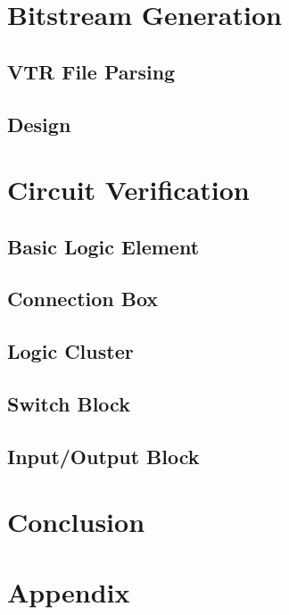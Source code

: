 \documentclass[12pt]{article}
\begin{document}
\newpage
\section{Bitstream Generation}

\subsection{VTR File Parsing}

\subsection{Design}

\newpage
\section{Circuit Verification}

\subsection{Basic Logic Element}

\subsection{Connection Box}

\subsection{Logic Cluster}

\subsection{Switch Block}

\subsection{Input/Output Block}

\newpage
\section{Conclusion}

\newpage
{}


\newpage
\section{Appendix}
\end{document}
